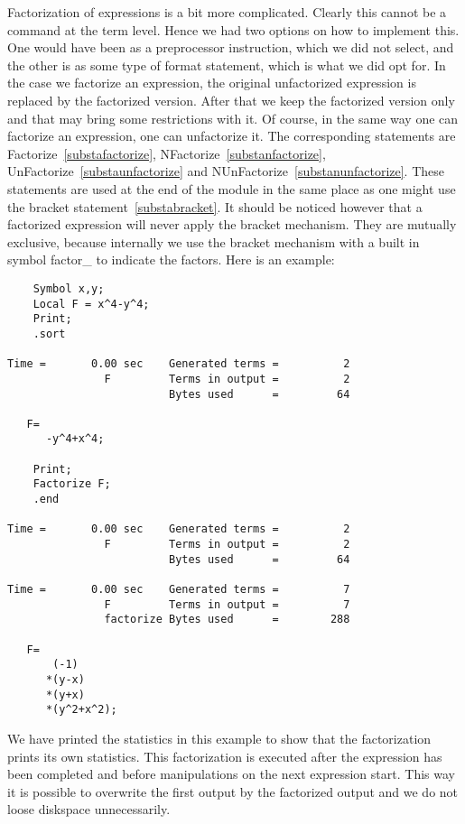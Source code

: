 \noindent Factorization of expressions is a bit more complicated. Clearly 
this cannot be a command at the term level. Hence we had two options on how 
to implement this. One would have been as a preprocessor instruction, which 
we did not select, and the other is as some type of format statement, which 
is what we did opt for. In the case we factorize an expression, the 
original unfactorized expression is replaced by the factorized version. 
After that we keep the factorized version only and that may bring some 
restrictions with it. Of course, in the same way one can factorize an 
expression, one can unfactorize it. The corresponding statements are 
Factorize~\ref{substafactorize}, NFactorize~\ref{substanfactorize}, 
UnFactorize~\ref{substaunfactorize} and 
NUnFactorize~\ref{substanunfactorize}. These statements are used at the end 
of the module in the same place as one might use the bracket 
statement~\ref{substabracket}. It should be noticed however that a 
factorized expression will never apply the bracket mechanism. They are 
mutually exclusive, because internally we use the bracket mechanism with a 
built in symbol factor\_ to indicate the factors. Here is an example:
\begin{verbatim}
    Symbol x,y;
    Local F = x^4-y^4;
    Print;
    .sort

Time =       0.00 sec    Generated terms =          2
               F         Terms in output =          2
                         Bytes used      =         64

   F=
      -y^4+x^4;

    Print;
    Factorize F;
    .end

Time =       0.00 sec    Generated terms =          2
               F         Terms in output =          2
                         Bytes used      =         64

Time =       0.00 sec    Generated terms =          7
               F         Terms in output =          7
               factorize Bytes used      =        288

   F=
       (-1)
      *(y-x)
      *(y+x)
      *(y^2+x^2);
\end{verbatim}
We have printed the statistics in this example to show that the 
factorization prints its own statistics. This factorization is executed 
after the expression has been completed and before manipulations on the 
next expression start. This way it is possible to overwrite the first 
output by the factorized output and we do not loose diskspace 
unnecessarily.

